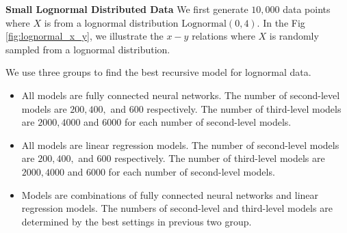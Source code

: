 \textbf{Small Lognormal Distributed Data} We first generate $10,000$ data points where $X$ is from a lognormal distribution $\text{Lognormal}(0, 4)$. In the Fig \ref{fig:lognormal_x_y}, we illustrate the $x-y$ relations where $X$ is randomly sampled from a lognormal distribution.



We use three groups to find the best recursive model for lognormal data.
\begin{itemize}
	\item All models are fully connected neural networks. The number of second-level models are $200, 400,$ and $600$ respectively. The number of third-level models are $2000, 4000$ and $6000$ for each number of second-level models.
	\item All models are linear regression models. The number of second-level models are $200, 400,$ and $600$ respectively. The number of third-level models are $2000, 4000$ and $6000$ for each number of second-level models.
	\item Models are combinations of fully connected neural networks and linear regression models. The numbers of second-level and third-level models are determined by the best settings in previous two group.
\end{itemize}

